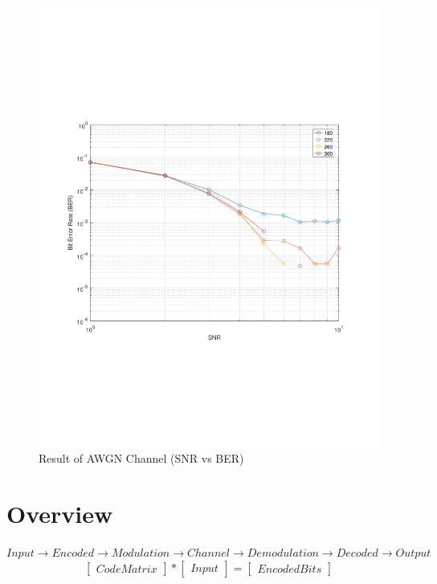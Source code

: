\documentclass[12pt,a4paper,onecolumn]{article}
\begin{document}
\begin{figure}[htb]  
\vspace{-0.1in}
  \begin{center}
\includegraphics[scale=0.4]{Fountainplot.pdf} 
\caption{Result of AWGN Channel (SNR vs BER)}
\label{AWGN_Channel}
 \end{center}
\vspace{-0.1in}
\end{figure}

\section{Overview}
$Input \to Encoded \to Modulation \to Channel \to Demodulation \to Decoded \to Output
$
\begin{equation*}
\begin{bmatrix}
Code Matrix 
\end{bmatrix}
*  
\begin{bmatrix}
Input
\end{bmatrix} 
= 
\begin{bmatrix}
Encoded Bits 
\end{bmatrix}
\end{equation*}
\end{document}
